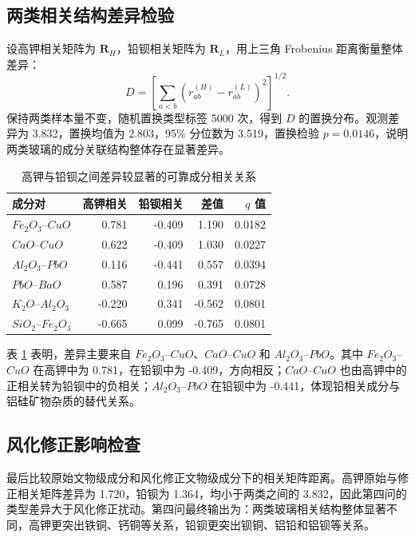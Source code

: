\documentclass[UTF8,zihao=-4,a4paper,fontset=fandol]{ctexart}
\begin{document}
\subsection{两类相关结构差异检验}

设高钾相关矩阵为 $\bm R_H$，铅钡相关矩阵为 $\bm R_L$，用上三角 Frobenius 距离衡量整体差异：
\begin{equation}
  D=\left[\sum_{a<b}(r_{ab}^{(H)}-r_{ab}^{(L)})^2\right]^{1/2}.
  \label{eq:frobenius}
\end{equation}
保持两类样本量不变，随机置换类型标签 5000 次，得到 $D$ 的置换分布。观测差异为 3.832，置换均值为 2.803，95\% 分位数为 3.519，置换检验 $p=0.0146$，说明两类玻璃的成分关联结构整体存在显著差异。

\begin{table}[H]
  \centering
  \caption{高钾与铅钡之间差异较显著的可靠成分相关关系}
  \label{tab:q4-diff}
  \begin{tabular}{lrrrr}
    \toprule
    成分对 & 高钾相关 & 铅钡相关 & 差值 & $q$ 值 \\
    \midrule
    $Fe_2O_3$--$CuO$ & 0.781 & -0.409 & 1.190 & 0.0182 \\
    $CaO$--$CuO$ & 0.622 & -0.409 & 1.030 & 0.0227 \\
    $Al_2O_3$--$PbO$ & 0.116 & -0.441 & 0.557 & 0.0394 \\
    $PbO$--$BaO$ & 0.587 & 0.196 & 0.391 & 0.0728 \\
    $K_2O$--$Al_2O_3$ & -0.220 & 0.341 & -0.562 & 0.0801 \\
    $SiO_2$--$Fe_2O_3$ & -0.665 & 0.099 & -0.765 & 0.0801 \\
    \bottomrule
  \end{tabular}
\end{table}

表 \ref{tab:q4-diff} 表明，差异主要来自 $Fe_2O_3$--$CuO$、$CaO$--$CuO$ 和 $Al_2O_3$--$PbO$。其中 $Fe_2O_3$--$CuO$ 在高钾中为 0.781，在铅钡中为 -0.409，方向相反；$CaO$--$CuO$ 也由高钾中的正相关转为铅钡中的负相关；$Al_2O_3$--$PbO$ 在铅钡中为 -0.441，体现铅相关成分与铝硅矿物杂质的替代关系。

\subsection{风化修正影响检查}

最后比较原始文物级成分和风化修正文物级成分下的相关矩阵距离。高钾原始与修正相关矩阵差异为 1.720，铅钡为 1.364，均小于两类之间的 3.832，因此第四问的类型差异大于风化修正扰动。第四问最终输出为：两类玻璃相关结构整体显著不同，高钾更突出铁铜、钙铜等关系，铅钡更突出钡铜、铝铅和铝钡等关系。
\end{document}
